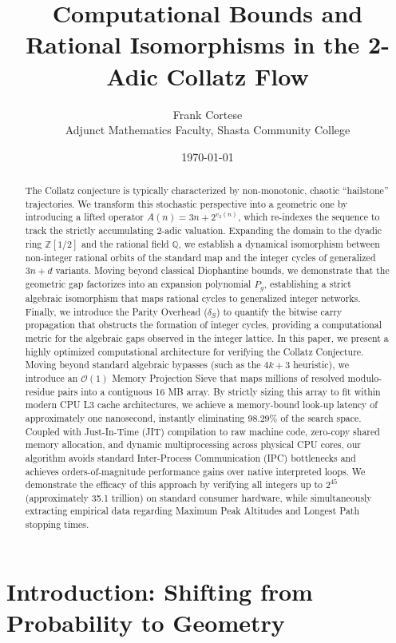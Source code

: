 \documentclass[11pt, a4paper]{article}
\title{Computational Bounds and Rational Isomorphisms in the 2-Adic Collatz Flow}
\author{Frank Cortese \\ \small{Adjunct Mathematics Faculty, Shasta Community College}}
\date{\today}
\theoremstyle{definition}
\begin{document}
\maketitle

\begin{abstract}
The Collatz conjecture is typically characterized by non-monotonic, chaotic ``hailstone'' trajectories. We transform this stochastic perspective into a geometric one by introducing a lifted operator $A(n)=3n+2^{v_2(n)}$, which re-indexes the sequence to track the strictly accumulating 2-adic valuation. Expanding the domain to the dyadic ring $\mathbb{Z}[1/2]$ and the rational field $\mathbb{Q}$, we establish a dynamical isomorphism between non-integer rational orbits of the standard map and the integer cycles of generalized $3n+d$ variants. Moving beyond classical Diophantine bounds, we demonstrate that the geometric gap factorizes into an expansion polynomial $P_g$, establishing a strict algebraic isomorphism that maps rational cycles to generalized integer networks. Finally, we introduce the Parity Overhead ($\delta_S$) to quantify the bitwise carry propagation that obstructs the formation of integer cycles, providing a computational metric for the algebraic gaps observed in the integer lattice. In this paper, we present a highly optimized computational architecture for verifying the Collatz Conjecture. Moving beyond standard algebraic bypasses (such as the $4k+3$ heuristic), we introduce an $\mathcal{O}(1)$ Memory Projection Sieve that maps millions of resolved modulo-residue pairs into a contiguous 16 MB array. By strictly sizing this array to fit within modern CPU L3 cache architectures, we achieve a memory-bound look-up latency of approximately one nanosecond, instantly eliminating 98.29\% of the search space. Coupled with Just-In-Time (JIT) compilation to raw machine code, zero-copy shared memory allocation, and dynamic multiprocessing across physical CPU cores, our algorithm avoids standard Inter-Process Communication (IPC) bottlenecks and achieves orders-of-magnitude performance gains over native interpreted loops. We demonstrate the efficacy of this approach by verifying all integers up to $2^{45}$ (approximately 35.1 trillion) on standard consumer hardware, while simultaneously extracting empirical data regarding Maximum Peak Altitudes and Longest Path stopping times.
\end{abstract}

\section{Introduction: Shifting from Probability to Geometry}
\end{document}
